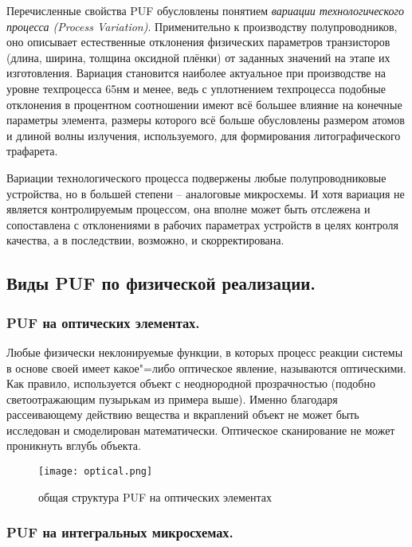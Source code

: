 Перечисленные свойства PUF обусловлены понятием \emph{вариации технологического процесса (Process Variation)}. Применительно к производству полупроводников, оно описывает естественные отклонения физических параметров транзисторов (длина, ширина, толщина оксидной плёнки) от заданных значений на этапе их изготовления. Вариация становится наиболее актуальное при производстве на уровне техпроцесса 65нм и менее, ведь с уплотнением техпроцесса подобные отклонения в процентном соотношении имеют всё большее влияние на конечные параметры элемента, размеры которого всё больше обусловлены размером атомов и длиной волны излучения, используемого, для формирования литографического трафарета.

Вариации технологического процесса подвержены любые полупроводниковые устройства, но в большей степени -- аналоговые микросхемы. И хотя вариация не является контролируемым процессом, она вполне может быть отслежена и сопоставлена с отклонениями в рабочих параметрах устройств в целях контроля качества, а в последствии, возможно, и скорректирована.



\subsection{Виды PUF по физической реализации. }
\label{sub:domain:puf_physical_types}


\subsubsection{PUF на оптических элементах. }
\label{sub:domain:puf_physical_types:optical}

Любые физически неклонируемые функции, в которых процесс реакции системы в основе своей имеет какое"=либо оптическое явление, называются оптическими.
Как правило, используется объект с неоднородной прозрачностью (подобно светоотражающим пузырькам из примера выше). Именно благодаря рассеивающему действию вещества и вкраплений объект не может быть исследован и смоделирован математически. Оптическое сканирование не может проникнуть вглубь объекта.
\begin{figure}[ht]
    \centering
    \label{fig:domain:puf_physical_types:optical}
    \texttt{[image: optical.png]}
    \caption{общая структура PUF на оптических элементах}
\end{figure}


\subsubsection{PUF на интегральных микросхемах. }
\label{sub:domain:puf_physical_types:ic}

